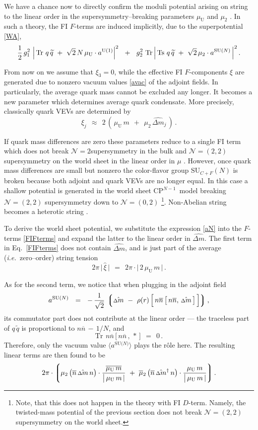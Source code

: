 \documentclass[12pt]{article}
\def\beq{\begin{equation}}
\def\eeq{\end{equation}}
\newcommand{\ntwo}{${\mathcal N}=2$}
\newcommand{\ntwot}{${\mathcal N}= \left(2,2\right) $ }
\newcommand{\ntwoo}{${\mathcal N}= \left(0,2\right) $ }
\newcommand{\wt}{\widetilde}
\newcommand{\ov}{\overline}
\newcommand{\lgr}{\left\lgroup}
\newcommand{\rgr}{\right\rgroup}
\newcommand{\aU}{a^{\rm U(1)}}
\newcommand{\aN}{a^\text{SU($N$)}}
\newcommand{\nbar}{\ov{n}}
\newcommand{\nnbar}{n\ov{n}}
\newcommand{\muU}{\mu_\text{U}}
\newcommand{\cpn}{CP$^{N-1}$\,}
\newcommand{\qt}{\wt{q}}
\newcommand{\Tr}{\text{Tr}}
\newcommand{\Ts}{\text{Ts}}
\newcommand{\dm}{\hat{{\scriptstyle \Delta} m}}
\newcommand{\dmdag}{\hat{{\scriptstyle \Delta} m}{}^\dag}
\newcommand{\ie}{{\it i.e.}~}
\begin{document}
	We have a chance now to directly confirm the moduli potential arising on string to the linear order
	in the supersymmetry--breaking parameters $ \muU $ and $ \mu_2 $ \cite{Shifman:2010kr}.
	In such a theory, the FI $ F $-terms are induced implicitly, due to the superpotential \eqref{WA},
\beq
\label{FIFterms}
	\frac{1}{2}\,g_1^2~ \Big|\, \Tr~ q\, \qt ~+~ \sqrt{2}\, N\, \muU \cdot \aU \Big|^2
	~~+~~
	g_2^2~ \Tr\, \Big|\, \Ts~ q\, \qt ~+~ \sqrt{2}\, \mu_2 \cdot \aN \,\Big|^2\,.
\eeq

From now on we assume that $\xi_3=0$, while the effective FI $F$-components  $\xi$ are generated due to nonzero
 vacuum values \eqref{avac} of the adjoint fields. In particularly,
 the average quark mass cannot be excluded any longer. It becomes a
 new parameter which determines average quark condensate. More precisely, classically quark VEVs are determined by
\beq
\label{xij}
	\xi_j    ~~\approx~~    2\, \left(\, \muU\,m  ~~+~~  \mu_2\,\dm{}_j \,\right)\,.
\eeq

If quark mass differences are zero these parameters reduce to a single FI term which does not break \ntwo supersymmetry in the bulk and \ntwot supersymmetry on the world sheet in the linear order in $\mu$ \cite{HSZ,VY}. However, once quark mass differences are small but nonzero the color-flavor group SU$_{C+F}(N)$ is broken because both  adjoint and quark VEVs are no longer equal. In this 
 case a shallow potential is generated in the world sheet \cpn
 model
 breaking \ntwot supersymmetry down to \ntwoo \cite{Shifman:2010kr} \footnote{Note, that this does not happen 
 in the theory with FI $D$-term. Namely, the twisted-mass
 potential of the previous section does not break \ntwot supersymmetry on the world sheet.}. Non-Abelian string becomes a heterotic string \cite{Edalati,SY1}.



	To derive the world sheet potential, we substitute the expression \eqref{aN} into the $ F $-terms
	\eqref{FIFterms} and expand the latter to the linear order in $ \dm $.
	The first term in Eq.~\eqref{FIFterms} does not contain $ \dm $, 
	and is just part of the average (\ie zero--order) string tension
\beq
\label{avtension}
	2 \pi\, \big|\, \hat{\xi} \,\big|    ~~=~~    2 \pi \cdot \Big|\, 2\, \muU\, m \,\Big| \,.
\eeq
	
	As for the second term, we notice that when plugging in the adjoint field 
\[
	\aN    ~~=~~    
	-\, \frac{1}{\sqrt{2}}\, 
	\lgr \dm  ~-~  \rho(r)\, \Big[\, \nnbar\, \big[\, \nnbar,\, \dm \,\big] \,\Big] \rgr,
\]
	its commutator part does not contribute at the linear order --- 
	the traceless part of $ q\, \qt $ is proportional to $ \nnbar \,-\, 1/N $, and
\[
	\Tr~\, \nnbar \, \big[\, \nnbar \,,\, * \,\big]    ~~=~~    0\,.
\]
	Therefore, only the vacuum value $ \langle \aN \rangle $ plays the r\^ole here.
	The resulting linear terms are then found to be 
\beq
	2\pi \cdot 
	\lgr
		\mu_2\, \big(\nbar\, \dm\, n\big) \cdot \frac{\ov{\muU\, m}}{\big|\, \muU\, m \,|}
		~+~
		\ov{\mu}{}_2\, \big(\nbar\, \dmdag\, n\big) \cdot \frac{\muU\, m}{\big|\, \muU\, m \,|}
	\rgr.
\eeq
\end{document}
